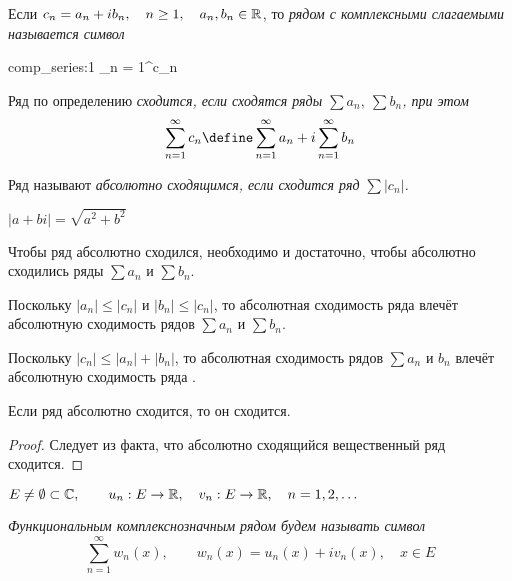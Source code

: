 \begin{definition}
	Если $ c_n = a_n + ib_n, \quad n \ge 1, \quad a_n, b_n \in \mathbb{R} $, то \it{рядом с комплексными слагаемыми} называется символ
	\begin{equ}{comp_series:1}
		\sum_{n = 1}^\infty c_n
	\end{equ}
\end{definition}

\begin{definition}
	Ряд  по определению \it{сходится}, если сходятся ряды $ \sum a_n, ~ \sum b_n $, при этом
	$$ \sum_{n = 1}^\infty c_n \define \sum_{n = 1}^\infty a_n + i \sum_{n = 1}^\infty b_n $$
\end{definition}

\begin{definition}
	Ряд  называют \it{абсолютно сходящимся}, если сходится ряд $ \sum |c_n| $.
\end{definition}

\begin{remind}
	$ |a + bi| = \sqrt{a^2 + b^2} $
\end{remind}

\begin{statement}
	Чтобы ряд  абсолютно сходился, необходимо и достаточно, чтобы абсолютно сходились ряды $ \sum a_n $ и $ \sum b_n $.
\end{statement}

\begin{iproof}
	\item Поскольку $ |a_n| \le |c_n| $ и $ |b_n| \le |c_n| $, то абсолютная сходимость ряда  влечёт абсолютную сходимость рядов $ \sum a_n $ и $ \sum b_n $.

	\item Поскольку $ |c_n| \le |a_n| + |b_n| $, то абсолютная сходимость рядов $ \sum a_n $ и $ b_n $ влечёт абсолютную сходимость ряда .
\end{iproof}

\begin{implication}
	Если ряд  абсолютно сходится, то он сходится.
\end{implication}

\begin{proof}
	Следует из факта, что абсолютно сходящийся вещественный ряд сходится.
\end{proof}

\begin{definition}
	$ E \ne \emptyset \subset \mathbb{C}, \qquad u_n : E \to \mathbb{R}, \quad v_n : E \to \mathbb{R}, \quad n = 1, 2, \dots $

	\it{Функциональным комплекснозначным рядом} будем называть символ
	$$ \sum_{n = 1}^\infty w_n(x), \qquad w_n(x) = u_n(x) + iv_n(x), \quad x \in E $$
\end{definition}

